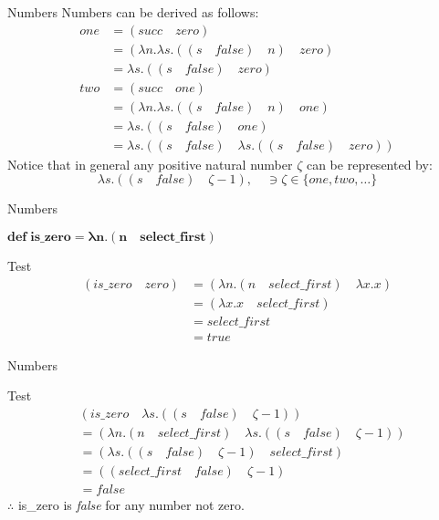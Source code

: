 \documentclass{beamer}
\begin{document}
\begin{frame}{Numbers}
	Numbers can be derived as follows:
	\begin{align*}
    	one &= (succ \quad zero) \\
        &= (\lambda n . \lambda s . ((s \quad false) \quad n) \quad zero) \\
        &= \lambda s . ((s \quad false) \quad zero) \\
        two &= (succ \quad one) \\
        &= (\lambda n . \lambda s . ((s \quad false) \quad n) \quad one) \\
        &= \lambda s . ((s \quad false) \quad one) \\
        &= \lambda s . ((s \quad false) \quad \lambda s . ((s \quad false) \quad zero))
    \end{align*}
    Notice that in general any positive natural number $\zeta$ can be represented by: $$\lambda s . ((s \quad false) \quad \zeta - 1), \quad \ni \zeta \in \{one, two, \dots \} $$
\end{frame}

\begin{frame}{Numbers}
\begin{framed} $\mathbf{def \; is\_zero = \lambda n . (n \quad select\_first)}$ \end{framed}
\begin{block}{Test}
  \begin{align*}
    (is\_zero \quad zero) &= (\lambda n . (n \quad select\_first) \quad \lambda x . x) \\
    &= (\lambda x . x \quad select\_first) \\
    &= select\_first \\
    &= true
  \end{align*}
\end{block}
\end{frame}

\begin{frame}{Numbers}
\begin{block}{Test}
  \begin{align*}
    &(is\_zero \quad \lambda s . ((s \quad false) \quad \zeta - 1)) \\
    &= (\lambda n . (n \quad select\_first) \quad \lambda s . ((s \quad false) \quad \zeta - 1)) \\
    &= (\lambda s . ((s \quad false) \quad \zeta - 1) \quad select\_first) \\
    &= ((select\_first \quad false) \quad \zeta - 1) \\
    &= false
  \end{align*}
  $\therefore$ is\_zero is \textit{false} for any number not zero.
\end{block}
\end{frame}
\end{document}
